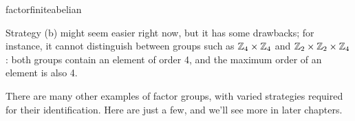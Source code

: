 \begin{examples}{}{factorfiniteabelian}
\begin{enumerate}
\end{enumerate}
\end{examples}

Strategy (b) might seem easier right now, but it has some drawbacks; for instance, it cannot distinguish between groups such as $\mathbb{Z}_4\times\mathbb{Z}_4$ and $\mathbb{Z}_2\times\mathbb{Z}_2\times\mathbb{Z}_4$: both groups contain an element of order 4, and the maximum order of an element is also 4.



There are many other examples of factor groups, with varied strategies required for their identification. Here are just a few, and we'll see more in later chapters.

